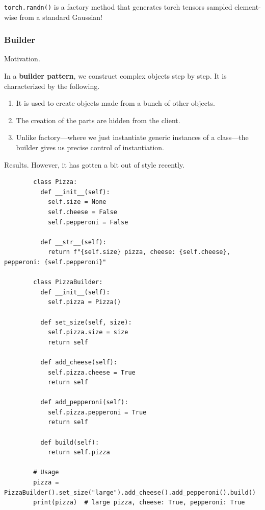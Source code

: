     \begin{example}
      \label{ex:case-study}
      \texttt{torch.randn()} is a factory method that generates torch tensors sampled element-wise from a standard Gaussian! 
    \end{example}

  \subsubsection{Builder} 

    Motivation. 

    \begin{definition}
      \label{def:builder-pattern}
      In a \textbf{builder pattern}, we construct complex objects step by step. It is characterized by the following. 
      \begin{enumerate}
        \item It is used to create objects made from a bunch of other objects. 
        \item The creation of the parts are hidden from the client. 
        \item Unlike factory---where we just instantiate generic instances of a class---the builder gives us precise control of instantiation. 
      \end{enumerate}
    \end{definition}

    Results. However, it has gotten a bit out of style recently. 

    \begin{example}[Pizza]
      \label{ex:pizza}
      \begin{lstlisting}
        class Pizza:
          def __init__(self):
            self.size = None
            self.cheese = False
            self.pepperoni = False
          
          def __str__(self):
            return f"{self.size} pizza, cheese: {self.cheese}, pepperoni: {self.pepperoni}"

        class PizzaBuilder:
          def __init__(self):
            self.pizza = Pizza()
          
          def set_size(self, size):
            self.pizza.size = size
            return self
          
          def add_cheese(self):
            self.pizza.cheese = True
            return self
          
          def add_pepperoni(self):
            self.pizza.pepperoni = True
            return self
          
          def build(self):
            return self.pizza

        # Usage
        pizza = PizzaBuilder().set_size("large").add_cheese().add_pepperoni().build()
        print(pizza)  # large pizza, cheese: True, pepperoni: True 
      \end{lstlisting}
    \end{example}

